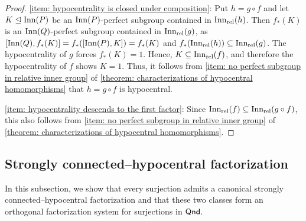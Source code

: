 
\begin{proof}
\eqref{item: hypocentrality is closed under composition}:
Put $h=g\circ f$ and let $K\trianglelefteq\operatorname{Inn}(P)$ be an $\operatorname{Inn}(P)$-perfect subgroup contained in $\operatorname{Inn_{rel}}(h)$. Then $f_*(K)$ is an $\operatorname{Inn}(Q)$-perfect subgroup contained in $\operatorname{Inn_{rel}}(g)$, as $[\operatorname{Inn}(Q),f_*(K)]=f_*([\operatorname{Inn}(P),K])=f_*(K)$ and $f_*(\operatorname{Inn_{rel}}(h)) \subseteq \operatorname{Inn_{rel}}(g)$. The hypocentrality of $g$ forces $f_*(K)=1$. Hence, $K\subseteq\operatorname{Inn_{rel}}(f)$, and therefore the hypocentrality of $f$ shows $K=1$.
Thus, it follows from \ref{item: no perfect subgroup in relative inner group} of \cref{theorem: characterizations of hypocentral homomorphisms} that $h=g\circ f$ is hypocentral.

\eqref{item: hypocentrality descends to the first factor}: Since $\operatorname{Inn_{rel}}(f)\subseteq\operatorname{Inn_{rel}}(g\circ f)$, this also follows from \ref{item: no perfect subgroup in relative inner group} of \cref{theorem: characterizations of hypocentral homomorphisms}.
\end{proof}





\subsection{Strongly connected--hypocentral factorization}
\label{subsection: strongly connected-hypocentral factorization}

In this subsection, we show that every surjection admits a canonical strongly connected--hypocentral factorization and that these two classes form an orthogonal factorization system for surjections in $\mathsf{Qnd}$.


